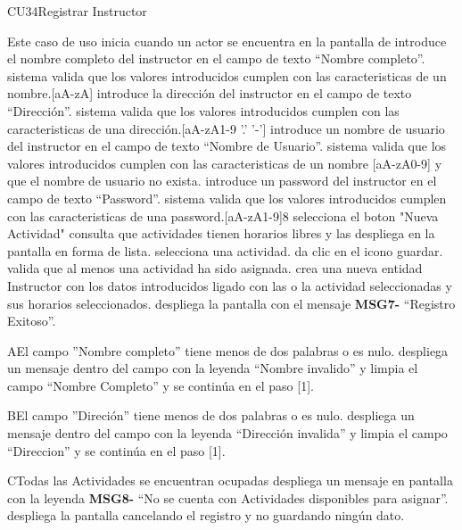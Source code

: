 \begin{UseCase}{CU34}{Registrar Instructor}
{\begin{UCtrayectoria}{Este caso de uso inicia cuando un actor se encuentra en la pantalla de }
	\UCpaso[\UCactor]introduce el nombre completo del instructor en el campo de texto “Nombre completo”.
	\UCpaso sistema valida que los valores introducidos cumplen con las caracteristicas de un nombre.[aA-zA]
	\UCpaso[\UCactor]introduce la dirección del instructor en el campo de texto “Dirección”.
	\UCpaso sistema valida que los valores introducidos cumplen con las caracteristicas de una dirección.[aA-zA1-9 '.' '-']
	\UCpaso[\UCactor]introduce un nombre de usuario del instructor en el campo de texto “Nombre de Usuario”.
	\UCpaso sistema valida que los valores introducidos cumplen con las caracteristicas de un nombre [aA-zA0-9] y que el nombre de usuario no exista.
	\UCpaso[\UCactor]introduce un password del instructor en el campo de texto “Password”.
	\UCpaso sistema valida que los valores introducidos cumplen con las caracteristicas de una password.[aA-zA1-9]{8}
	\UCpaso selecciona el boton "Nueva Actividad"
	\UCpaso consulta que actividades tienen horarios libres y las despliega en la pantalla en forma de lista.
	\UCpaso[\UCactor] selecciona una actividad.
	\UCpaso {}
	\UCpaso [\UCactor] da clic en el icono guardar.
	\UCpaso valida que al menos una actividad ha sido asignada.
	\UCpaso crea una nueva entidad Instructor con los datos introducidos ligado con las o la actividad seleccionadas y sus horarios seleccionados.
	\UCpaso despliega la pantalla  con el mensaje {\bf MSG7-} “Registro Exitoso”.
\end{UCtrayectoria}
\begin{UCtrayectoriaA}{A}{El campo ''Nombre completo'' tiene menos de dos palabras o es nulo.}
			\UCpaso despliega un mensaje dentro del campo con la leyenda “Nombre invalido” y limpia el campo “Nombre Completo” y se continúa en el paso [1].
\end{UCtrayectoriaA}
\begin{UCtrayectoriaA}{B}{El campo ''Direción'' tiene menos de dos palabras o es nulo.}
			\UCpaso despliega un mensaje dentro del campo con la leyenda “Dirección invalida” y limpia el campo “Direccion” y se continúa en el paso [1].
\end{UCtrayectoriaA}
\begin{UCtrayectoriaA}{C}{Todas las Actividades se encuentran ocupadas}
		   \UCpaso despliega un mensaje en pantalla con la leyenda {\bf MSG8-} “No se cuenta con Actividades disponibles para asignar”.
		   \UCpaso despliega la pantalla  cancelando el registro y no guardando ningún dato.

\end{UCtrayectoriaA}}
\end{UseCase}

